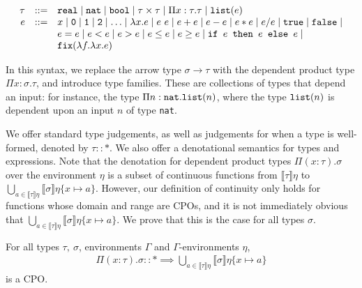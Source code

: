  \[
\begin{array}{rcl}
\tau &::=& \texttt{real} \mid \texttt{nat} \mid \texttt{bool} \mid \tau \times \tau \mid \Pi x:\tau.\tau
\mid \texttt{list}(e) \\
e &::=& x  \mid \texttt{0} \mid \texttt{1} \mid \texttt{2} \mid \dotsc \mid \lambda x.e \mid e \ e \mid e + e \mid e - e \mid  e  *  e \mid e / e \mid \texttt{true} \mid \texttt{false} \mid \\
  && e  =  e \mid e < e \mid e > e \mid e \leq e \mid e \geq e \mid 
     \texttt{if } e \texttt{ then } e \texttt{ else } e \mid \\
     && \texttt{fix}(\lambda f. \lambda x.e) 
\end{array}
\]

In this syntax, we replace the arrow type $\sigma \rightarrow \tau$ with the dependent product type
$\Pi x:\sigma.\tau$, and introduce type families. 
These are collections of types that depend an input: for instance,
the type $\Pi n:\texttt{nat}.\texttt{list}(n)$, where the type $\texttt{list}(n)$ is dependent upon an input $n$ of type \texttt{nat}.

We offer standard type judgements, as well as judgements for when a type is well-formed, denoted by $\tau :: *$. We 
also offer a denotational semantics for types and expressions. Note that the denotation for dependent product types
$\Pi (x : \tau).\sigma$ over the environment $\eta$ is a subset of continuous functions from 
$\llbracket \tau \rrbracket\eta$ to 
$\bigcup_{a \in \llbracket \tau \rrbracket\eta}\llbracket \sigma \rrbracket\eta\{x \mapsto a\}$. However, our definition of
continuity only holds for functions whose domain and range are CPOs, and it is not immediately obvious that 
$\bigcup_{a \in \llbracket \tau \rrbracket\eta}\llbracket \sigma \rrbracket\eta\{x \mapsto a\}$. We prove that this is
the case for all types $\sigma$. 

\begin{lemma}
For all types $\tau, \ \sigma$, environments $\Gamma$ and $\Gamma$-environments $\eta$,
\begin{align*}
\Pi(x : \tau).\sigma :: * \implies \bigcup_{a \in \llbracket \tau \rrbracket\eta}
\llbracket \sigma \rrbracket\eta\{x\mapsto a\} 
\end{align*}
is a CPO.
\end{lemma}

